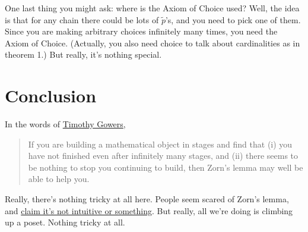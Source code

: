 One last thing you might ask:
where is the Axiom of Choice used?
Well, the idea is that for any chain there could be lots of $\tilde p$'s,
and you need to pick one of them.
Since you are making arbitrary choices infinitely many times, you need the Axiom of Choice.
(Actually, you also need choice to talk about cardinalities as in theorem 1.)
But really, it's nothing special.

\section{Conclusion}
In the words of \href{https://gowers.wordpress.com/2008/08/12/how-to-use-zorns-lemma/}{Timothy Gowers},
\begin{quote}
If you are building a mathematical object in stages and find that (i) you have not finished even after infinitely many stages, and (ii) there seems to be nothing to stop you continuing to build, then Zorn's lemma may well be able to help you.
\end{quote}
Really, there's nothing tricky at all here.
People seem scared of Zorn's lemma,
and \href{http://math.stackexchange.com/questions/251726/simple-and-intuitive-example-for-zorns-lemma}{claim it's not intuitive or something}.
But really, all we're doing is climbing up a poset.
Nothing tricky at all.
